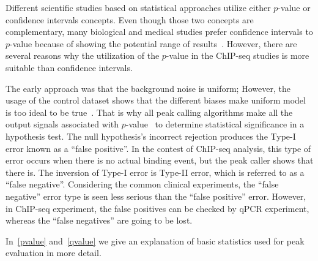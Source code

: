 Different scientific studies based on statistical approaches utilize either $p$-value or confidence intervals concepts. 
Even though those two concepts are complementary, many biological and medical studies prefer confidence intervals to $p$-value because of showing the potential range of results~\cite{feinstein1998p}.
However, there are several reasons why the utilization of the $p$-value in the ChIP-seq studies is more suitable than confidence intervals.


The early approach was that the background noise is uniform; 
However, the usage of the control dataset shows that the different biases make uniform model is too ideal to be true~\cite{robertson2007genome}. 
That is why all peak calling algorithms make all the output signals associated with $p$-value~\cite{chitpin2019recap} to determine statistical significance in a hypothesis test. 
The null hypothesis's incorrect rejection produces the Type-I error known as a ``false positive''. 
In the contest of ChIP-seq analysis, this type of error occurs when there is no actual binding event, but the peak caller shows that there is. 
The inversion of Type-I error is Type-II error, which is referred to as a ``false negative''. 
Considering the common clinical experiments, the ``false negative'' error type is seen less serious than the ``false positive'' error.
However, in ChIP-seq experiment, the false positives can be checked by qPCR experiment, whereas the ``false negatives'' are going to be lost. 

In~\ref{pvalue} and~\ref{qvalue} we give an explanation of basic statistics used for peak evaluation in more detail.




